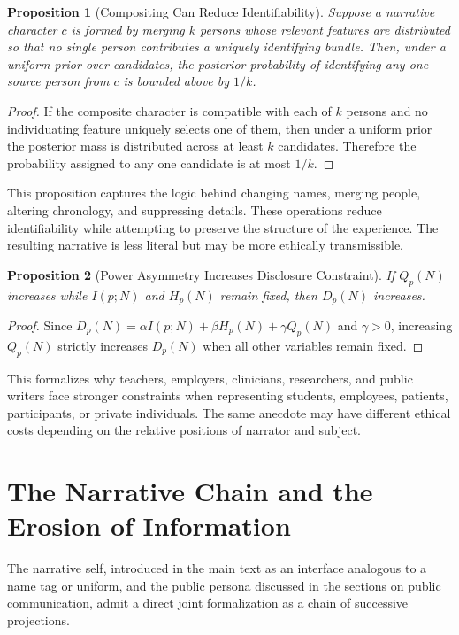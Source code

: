 \documentclass[11pt]{article}
\theoremstyle{plain}
\newtheorem{proposition}{Proposition}[section]
\begin{document}
\begin{proposition}[Compositing Can Reduce Identifiability]
Suppose a narrative character $c$ is formed by merging $k$ persons whose relevant features are distributed so that no single person contributes a uniquely identifying bundle. Then, under a uniform prior over candidates, the posterior probability of identifying any one source person from $c$ is bounded above by $1/k$.
\end{proposition}
\begin{proof}
If the composite character is compatible with each of $k$ persons and no individuating feature uniquely selects one of them, then under a uniform prior the posterior mass is distributed across at least $k$ candidates. Therefore the probability assigned to any one candidate is at most $1/k$.
\end{proof}

This proposition captures the logic behind changing names, merging people, altering chronology, and suppressing details. These operations reduce identifiability while attempting to preserve the structure of the experience. The resulting narrative is less literal but may be more ethically transmissible.

\begin{proposition}[Power Asymmetry Increases Disclosure Constraint]
If $Q_p(N)$ increases while $I(p;N)$ and $H_p(N)$ remain fixed, then $D_p(N)$ increases.
\end{proposition}
\begin{proof}
Since $D_p(N) = \alpha I(p;N) + \beta H_p(N) + \gamma Q_p(N)$ and $\gamma > 0$, increasing $Q_p(N)$ strictly increases $D_p(N)$ when all other variables remain fixed.
\end{proof}

This formalizes why teachers, employers, clinicians, researchers, and public writers face stronger constraints when representing students, employees, patients, participants, or private individuals. The same anecdote may have different ethical costs depending on the relative positions of narrator and subject.

\section{The Narrative Chain and the Erosion of Information}

The narrative self, introduced in the main text as an interface analogous to a name tag or uniform, and the public persona discussed in the sections on public communication, admit a direct joint formalization as a chain of successive projections.
\end{document}
